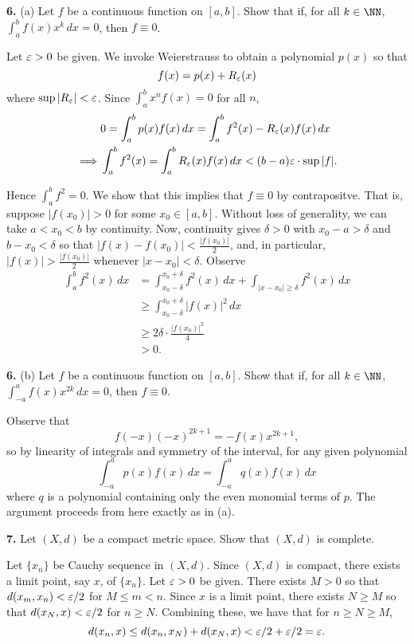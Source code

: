 \documentclass{homework}
\begin{document}
{\bf 6.} (a) Let $f$ be a continuous function on $[a,b]$.  Show that if, for all $k\in \NN$, $\int_a^bf(x)x^k\, dx = 0$, then $f\equiv0$.
\begin{solution}
  Let $\varepsilon > 0$ be given.  We invoke Weierstrauss to obtain a polynomial $p(x)$ so that 
  $$
    f(x) = p(x) + R_\varepsilon(x)
  $$
  where $\sup |R_\varepsilon| < \varepsilon$. Since $\int_a^b x^n f(x) = 0$ for all $n$, 
  \begin{align*}
    & 0 = \int_a^b p(x) f(x)\,dx = \int_a^b f^2(x) - R_\varepsilon(x)f(x)\,dx\\
    \implies& \int_a^b f^2(x) = \int_a^b R_\varepsilon(x) f(x)\, dx < (b-a)\varepsilon\cdot \sup|f|.
  \end{align*}

  Hence $\int_a^b f^2 = 0$. We show that this implies that $f \equiv 0$ by contrapositve.
  That is, suppose $|f(x_0)| > 0$ for some $x_0 \in [a,b]$.  Without loss
  of generality, we can take $a < x_0 < b$ by continuity.  Now, continuity
  gives $\delta > 0$ with $x_0-a>\delta$ and $b-x_0<\delta$ so that $|f(x) - f(x_0)| < \frac{|f(x_0)|}{2}$, and, in
  particular, $|f(x)| > \frac{|f(x_0)|}2$ whenever $|x-x_0|<\delta$. Observe
  \begin{align*}
    \int_a^b f^2(x)\,dx 
    &= \int_{x_0 - \delta}^{x_0+\delta} f^2(x)\,dx + \int_{|x-x_0|\ge\delta} f^2(x)\,dx\\
    &\ge \int_{x_0 - \delta}^{x_0+\delta} |f(x)|^2\,dx \\
    &\ge 2\delta\cdot \frac{|f(x_0)|^2}{4}\\
    &>0.
  \end{align*}
\end{solution}

{\bf 6.} (b) Let $f$ be a continuous function on $[a,b]$.  Show that if, for all $k \in \NN$, $\int_{-a}^af(x)x^{2k}\,dx = 0$, then $f\equiv 0$.

\begin{solution}
Observe that
$$
  f(-x)(-x)^{2k+1} = - f(x)x^{2k+1},
$$
so by linearity of integrals and symmetry of the interval, for any given polynomial 
$$
  \int_{-a}^a p(x)f(x)\,dx = \int_{-a}^aq(x)f(x)\,dx
$$
where $q$ is a polynomial containing only the even monomial terms of $p$.  The argument proceeds from here exactly as in (a).
\end{solution}

{\bf 7.} Let $(X,d)$ be a compact metric space.  Show that $(X,d)$ is complete.
\begin{solution}
  Let $\{x_n\}$ be Cauchy sequence in $(X,d)$.  Since $(X,d)$ is compact, there
  exists a limit point, say $x$, of $\{x_n\}$. Let $\varepsilon >0$ be given. There
  exists $M>0$ so that $d(x_m,x_n) < \varepsilon/2$ for $M\le m <n$. Since $x$ is a
  limit point, there exists $N\ge M$ so that $d(x_N,x) < \varepsilon/2$ for $n\ge N$.
  Combining these, we have that for $n \ge N \ge M$,
  $$
    d(x_n,x) \le d(x_n,x_N) + d(x_N,x) < \varepsilon/2 + \varepsilon/2 = \varepsilon.
  $$
\end{solution}
\end{document}
